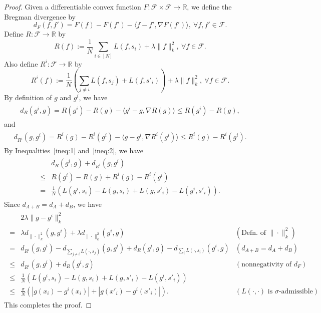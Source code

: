 \documentclass[11pt]{article}
\newcommand{\R}{\mathbb{R}}
\newcommand{\calF}{\mathcal{F}}
\begin{document}
	
	\begin{proof}
		Given a differentiable convex function $F: \calF\times \calF\rightarrow \R$, we define the Bregman divergence by
		\[
		d_F(f,f') = F(f)-F(f')-\langle f-f',\nabla F(f') \rangle, ~\forall f,f'\in \calF.
		\]
		Define $R:\calF\rightarrow \R$ by
		\[
		R(f):= \frac{1}{N}\sum_{i\in [N]} L(f,s_i) + \lambda \|f\|_k^2,~\forall f\in \calF.
		\]
		Also define $R^{i}:\calF\rightarrow \R$ by
		\[
		R^{i}(f):= \frac{1}{N} \left(\sum_{j\neq i} L(f,s_j) + L(f,s'_i) \right) + \lambda \|f\|_k^2,~\forall f\in \calF.
		\]
		By definition of $g$ and $g^{i}$, we have
		\begin{eqnarray}
		\label{ineq:1}
		\begin{split}
		d_{R}(g^{i},g) = R(g^{i})-R(g)-\langle g^{i}-g,\nabla R(g) \rangle
		\leq R(g^{i})-R(g),
		\end{split}
		\end{eqnarray}
		and
		\begin{eqnarray}
		\label{ineq:2}
		\begin{split}
		d_{R^{i}}(g,g^{i}) = R^{i}(g)- R^{i}(g^{i})-\langle g-g^{i},\nabla  R^{i}(g^{i}) \rangle
		\leq  R^{i}(g)- R^{i}(g^{i}).
		\end{split}
		\end{eqnarray}
		By Inequalities~\eqref{ineq:1} and~\eqref{ineq:2}, we have
		\begin{eqnarray}
		\label{ineq:3}
		\begin{split}
		&d_{R}(g^{i},g) + d_{R^{i}}(g,g^{i})\\
		\leq & R(g^{i})-R(g)+R^{i}(g)- R^{i}(g^{i}) \\
		=& \frac{1}{N} \left(L(g^{i},s_i)-L(g,s_i) + L(g, s'_i)- L(g^i, s'_i) \right).
		\end{split}
		\end{eqnarray}
		Since $d_{A+B}=d_A+d_B$, we have
		\begin{eqnarray}
		\label{ineq:4}
		\begin{split}
		& 2\lambda \|g-g^{i}\|_k^2 &\\
		=& \lambda d_{\|\cdot\|_k^2}(g,g^{i}) + \lambda d_{\|\cdot\|_k^2}(g^{i},g) 
		& (\text{Defn. of $\|\cdot\|_k^2$}) \\
		= & d_{R^{i}}(g,g^{i}) - d_{\sum_{j\neq i}L(\cdot,s_j)} (g,g^{i})
		+ d_{R}(g^{i},g) - d_{\sum_{i}L(\cdot,s_i)} (g^{i},g) 
		& (d_{A+B}=d_A+d_B) \\
		\leq& d_{R^{i}}(g,g^{i}) + d_{R}(g^{i},g) 
		& (\text{nonnegativity of $d_F$}) \\
		\leq& \frac{1}{N} \left(L(g^{i},s_i)-L(g,s_i) + L(g, s'_i)- L(g^i, s'_i) \right) &\\
		\leq& \frac{\sigma }{N}\left(|g(x_i)-g^{i}(x_i)|+|g(x'_i)-g^{i}(x'_i)| \right). 
		& (L(\cdot,\cdot) \text{ is $\sigma$-admissible} )
		\end{split}
		\end{eqnarray}
		This completes the proof.
	\end{proof}
	
\end{document}
